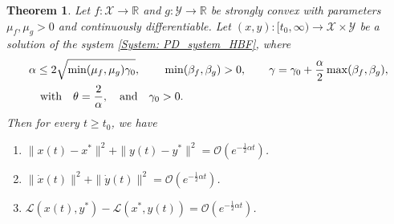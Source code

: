 \documentclass[pdflatex,sn-mathphys-num]{sn-jnl}
\theoremstyle{thmstyleone}
\newtheorem{theorem}{Theorem}
\theoremstyle{thmstyletwo}
\theoremstyle{thmstylethree}
\newcommand{\qbox}[1]{\quad\hbox{#1}\quad}
\newcommand{\R}{\mathbb{R}}
\newcommand{\X}{\mathcal{X}}
\newcommand{\Y}{\mathcal{Y}}
\begin{document}
\begin{theorem}
Let $f:\X\to\R$ and $g:\Y\to\R$ be strongly convex with parameters $\mu_f,\mu_g>0$ and continuously differentiable. Let $(x,y):[t_0,\infty)\to\X\times\Y$ be a solution of the system \eqref{System: PD_system_HBF}, where
\begin{align*}
& \alpha\le 2\sqrt{ \min(\mu_f,\mu_g) \gamma_0 },\qbox{} \min(\beta_f,\beta_g) > 0,\qbox{} \gamma = \gamma_0 + \frac{\alpha}{2} \max(\beta_f,\beta_g),\\
&\qbox{with} \theta = \frac{2}{\alpha},\qbox{and}\gamma_0 >0. 
\end{align*}
Then for every $t\ge t_0$, we have
\begin{enumerate}[label=(\roman*), itemsep=0.7em, leftmargin=12mm]
\item ${\| x(t) - x^* \|^2 + \| y(t) - y^* \|^2} = \mathcal{O}\left( e^{-\frac{1}{2}\alpha t} \right)$.

\item ${ \| \dot{x}(t) \|^2 + \| \dot{y}(t) \|^2 } = \mathcal{O}\left( e^{-\frac{1}{2}\alpha t} \right)$.

\item $\mathcal{L}(x(t),y^*) - \mathcal{L}(x^*,y(t)) = \mathcal{O}\left( e^{-\frac{1}{2}\alpha t} \right)$. 
\end{enumerate}
\end{theorem}
\end{document}

